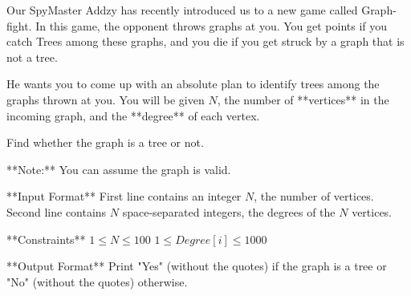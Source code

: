 Our SpyMaster Addzy has recently introduced us to a new game called Graph-fight. In this game, the opponent throws graphs at you. You get points if you catch Trees among these graphs, and you die if you get struck by a graph that is not a tree. 

He wants you to come up with an absolute plan to identify trees among the graphs thrown at you. You will be given $N$, the number of **vertices** in the incoming graph, and the **degree** of each vertex.

Find whether the graph is a tree or not.

**Note:** You can assume the graph is valid.

**Input Format**  
First line contains an integer $N$, the number of vertices.  
Second line contains $N$ space-separated integers, the degrees of the $N$ vertices.

**Constraints**  
$1 \leq N \leq 100$  
$1 \leq Degree[i] \leq 1000$

**Output Format**  
Print "Yes" (without the quotes) if the graph is a tree or "No" (without the quotes) otherwise.